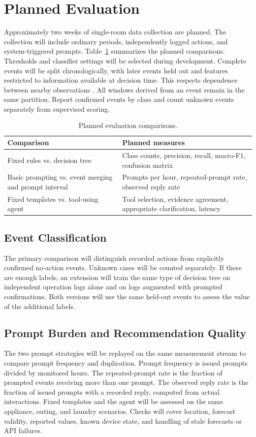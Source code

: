 \documentclass[conference]{IEEEtran}
\begin{document}
\section{Planned Evaluation}
Approximately two weeks of single-room data collection are planned. The collection will include ordinary periods, independently logged actions, and system-triggered prompts. Table~\ref{tab:evaluation} summarizes the planned comparisons. Thresholds and classifier settings will be selected during development. Complete events will be split chronologically, with later events held out and features restricted to information available at decision time. This respects dependence between nearby observations \cite{roberts2017cv}. All windows derived from an event remain in the same partition. Report confirmed events by class and count unknown events separately from supervised scoring.

\begin{table}[t]
\caption{Planned evaluation comparisons.}
\label{tab:evaluation}
\centering\footnotesize
\begin{tabular}{@{}p{}p{}@{}}
\hline
Comparison & Planned measures \\
\hline
Fixed rules vs. decision tree & Class counts, precision, recall, macro-F1, confusion matrix \\
Basic prompting vs. event merging and prompt interval & Prompts per hour, repeated-prompt rate, observed reply rate \\
Fixed templates vs. tool-using agent & Tool selection, evidence agreement, appropriate clarification, latency \\
\hline
\end{tabular}
\end{table}

\subsection{Event Classification}
The primary comparison will distinguish recorded actions from explicitly confirmed no-action events. Unknown cases will be counted separately. If there are enough labels, an extension will train the same type of decision tree on independent operation logs alone and on logs augmented with prompted confirmations. Both versions will use the same held-out events to assess the value of the additional labels.

\subsection{Prompt Burden and Recommendation Quality}
The two prompt strategies will be replayed on the same measurement stream to compare prompt frequency and duplication. Prompt frequency is issued prompts divided by monitored hours. The repeated-prompt rate is the fraction of prompted events receiving more than one prompt. The observed reply rate is the fraction of issued prompts with a recorded reply, computed from actual interactions. Fixed templates and the agent will be assessed on the same appliance, outing, and laundry scenarios. Checks will cover location, forecast validity, reported values, known device state, and handling of stale forecasts or API failures.
\end{document}
